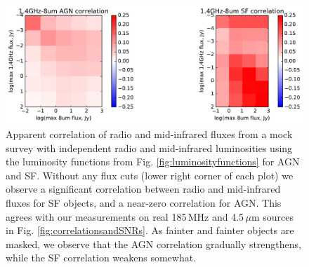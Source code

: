 \documentclass[numberedappendix]{emulateapj}
\providecommand{\DIFadd}[1]{{\protect\color{blue}\uwave{#1}}} %
\providecommand{\DIFaddFL}[1]{\DIFadd{#1}} %
\providecommand{\DIFaddbeginFL}{} %
\providecommand{\DIFaddendFL}{} %
\begin{document}
\begin{figure}[h]
\centering
\includegraphics[width=6in]{sim_correlation_agn_and_sf.pdf}
\caption[Apparent correlation of radio and mid-infrared fluxes from a mock survey.]{Apparent correlation of radio and mid-infrared fluxes from a mock \DIFaddbeginFL \DIFaddFL{volume-limited }\DIFaddendFL survey with independent radio and mid-infrared luminosities using the luminosity functions from Fig. \ref{fig:luminosityfunctions} for AGN and SF. Without any flux cuts (lower right corner of each plot) we observe a significant correlation between radio and mid-infrared fluxes for SF objects, and a near-zero correlation for AGN. This agrees with our measurements on real 185\,MHz and 4.5\,$\mu$m sources in Fig. \ref{fig:correlationsandSNRs}. As fainter and fainter objects are masked, we observe that the AGN correlation gradually strengthens, while the SF correlation weakens somewhat. }
\label{fig:simagnlfcorrelations}
\end{figure}
\end{document}
